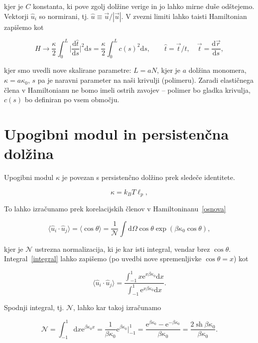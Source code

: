 \documentclass[12pt, a4 paper]{article}
\renewcommand{\u}{
	\ensuremath{\hat{u}}
}
\renewcommand{\d}{
	\ensuremath{\mathrm{d}}
}
\newcommand{\od}[2]{
	\ensuremath{\frac{\d #1}{\d #2}}
}
\newcommand{\e}{
	\ensuremath{\mathrm{e}}
}
\newcommand{\sh}{
	\operatorname{sh}
}
\begin{document}
kjer je $C$ konstanta, ki pove zgolj dol\v zine verige in jo lahko mirne du\v se od\v stejemo. Vektorji $\u_i$ so
normirani, tj. $\u \equiv \vec{u}/|\vec{u}|$. V zvezni limiti lahko taisti Hamiltonian zapi\v semo kot

\begin{equation}
	H \to \frac{\kappa}{2}\int_0^L \bigg|\od{\hat{t}}{s}\bigg|^2 \d s = \frac{\kappa}{2}
		\int_0^L c(s)^2 \d s, \qquad \hat{t} = \vec{t}/t, \quad \vec{t} = \od{\vec{r}}{s},
	\label{hamilton}
\end{equation}

kjer smo uvedli nove skalirane parametre: $L = aN$, kjer je $a$ dol\v zina monomera, $\kappa = a\kappa_0$, $s$ pa
je naravni parameter na na\v si krivulji (polimeru). Zaradi elasti\v cnega \v clena v Hamiltonianu ne bomo imeli
ostrih zavojev -- polimer bo gladka krivulja, $c(s)$ bo definiran po vsem obmo\v cju.

\section{Upogibni modul in persisten\v cna dol\v zina}

Upogibni modul $\kappa$ je povezan s persisten\v cno dol\v zino prek slede\v ce identitete. 

\begin{equation}
	\kappa = k_B T \ell_p,
\end{equation}

To lahko izra\v cunamo prek korelacijskih \v clenov v Hamiltoninanu~\eqref{osnova}

\begin{equation}
	\langle\u_i\cdot\u_{j}\rangle = \langle\cos\theta\rangle =
		\frac{1}{\mathcal{N}}\int\d\Omega\cos\theta\exp(\beta\kappa_0\cos\theta),
	\label{integral}
\end{equation}

kjer je $\mathcal{N}$ ustrezna normalizacija, ki je kar isti integral, vendar brez $\cos\theta$.
Integral~\eqref{integral} lahko zapi\v semo (po uvedbi nove spremenljivke $\cos\theta = x$) kot

\begin{equation}
	\langle\u_i\cdot\u_{j}\rangle = \frac{\int_{-1}^1 x\e^{x\beta\kappa_0}\d x}{\int_{-1}^1
		\e^{x\beta\kappa_0}\d x}.
\end{equation}

Spodnji integral, tj. $\mathcal{N}$, lahko kar takoj izra\v cunamo

\begin{equation}
	\mathcal{N} = \int_{-1}^1\d x\e^{\beta\kappa_0 x} = \frac{1}{\beta\kappa_0}\e^{\beta\kappa_0}
		\bigg|_{-1}^1 = \frac{\e^{\beta\kappa_0} - \e^{-\beta\kappa_0}}{\beta\kappa_0} =
		\frac{2\sh\beta\kappa_0}{\beta\kappa_0}.
\end{equation}
\end{document}
